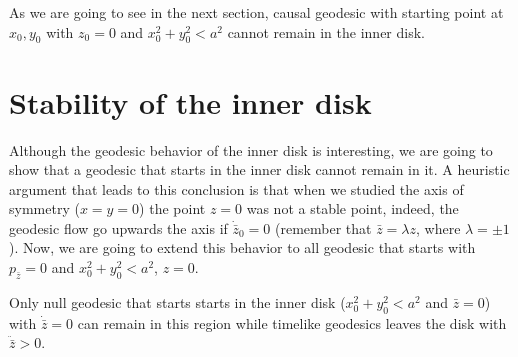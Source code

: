 As we are going to see in the next section, causal geodesic with starting point at $x_0,y_0$ with $z_0=0$ and $x_0^2+y_0^2<a^2$ cannot remain in the inner disk.
\section{Stability of the inner disk}

Although the geodesic behavior of the inner disk is interesting, we are going to show that a geodesic that starts in the inner disk cannot remain in it. A heuristic argument that leads to this conclusion is that when we studied the axis of symmetry ($x=y=0$) the point $z=0$ was not a stable point, indeed, the geodesic flow go upwards the axis if $\dot{\bar{z}}_0=0$ (remember that $\bar z=\lambda z$, where $\lambda=\pm 1$). Now, we are going to extend this behavior to all geodesic that starts with $p_{\bar{z}}=0$ and $x_0^2+y_0^2<a^2$, $z=0$.
\begin{proposition}
 Only null geodesic that starts starts in the inner disk ($x_0^2+y_0^2<a^2$ and $\bar{z}=0$) with $\dot{\bar{z}}=0$ can remain in this region while timelike geodesics leaves the disk with $\ddot{\bar{z}}>0$.
\end{proposition}
